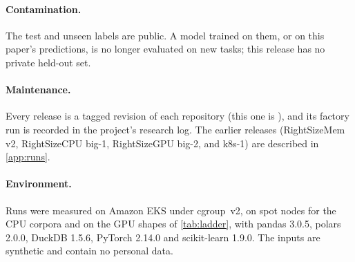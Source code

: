 \paragraph{Contamination.} The test and unseen labels are public. A model trained on them, or on this paper's
predictions, is no longer evaluated on new tasks; this release has no private held-out set.

\paragraph{Maintenance.} Every release is a tagged revision of each repository (this one is ), and
its factory run is recorded in the project's research log. The earlier releases (RightSizeMem v2, RightSizeCPU big-1,
RightSizeGPU big-2, and k8s-1) are described in \cref{app:runs}.

\paragraph{Environment.} Runs were measured on Amazon EKS under cgroup~v2, on spot  nodes for the
CPU corpora and on the GPU shapes of \cref{tab:ladder}, with pandas 3.0.5, polars 2.0.0, DuckDB 1.5.6, PyTorch
2.14.0 and scikit-learn 1.9.0. The inputs are synthetic and contain no personal data.
